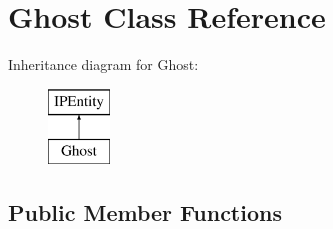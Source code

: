 \hypertarget{class_ghost}{}\section{Ghost Class Reference}
\label{class_ghost}
Inheritance diagram for Ghost\+:\begin{figure}[H]
\begin{center}
\leavevmode
\includegraphics[height=2.000000cm]{class_ghost}
\end{center}
\end{figure}
\subsection*{Public Member Functions}
